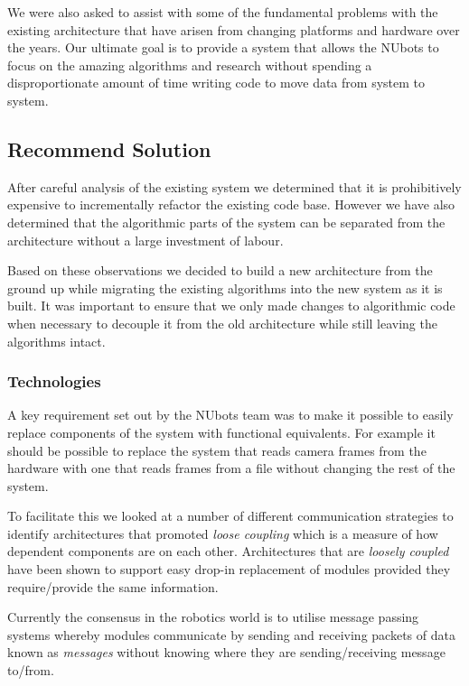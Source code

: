 \documentclass[english,12pt]{scrartcl}
\begin{document}
			We were also asked to assist with some of the fundamental problems with the existing architecture that have arisen from changing platforms and hardware over the years. 
			Our ultimate goal is to provide a system that allows the NUbots to focus on the amazing algorithms and research without spending a disproportionate amount of time writing code to move data from system to system.
				
		\subsection{Recommend Solution}
			After careful analysis of the existing system we determined that it is prohibitively expensive to incrementally refactor the existing code base.
			However we have also determined that the algorithmic parts of the system can be separated from the architecture without a large investment of labour. 
			
			Based on these observations we decided to build a new architecture from the ground up while migrating the existing algorithms into the new system as it is built.
			It was important to ensure that we only made changes to algorithmic code when necessary to decouple it from the old architecture while still leaving the algorithms intact.
			
			\subsubsection{Technologies}
				A key requirement set out by the NUbots team was to make it possible to easily replace components of the system with functional equivalents. 
				For example it should be possible to replace the system that reads camera frames from the hardware with one that reads frames from a file without changing the rest of the system.
				
				To facilitate this we looked at a number of different communication strategies to identify architectures that promoted \emph{loose coupling} which is a measure of how dependent components are on each other. 
				Architectures that are \emph{loosely coupled} have been shown to support easy drop-in replacement of modules provided they require/provide the same information.
				 
				Currently the consensus in the robotics world is to utilise message passing systems whereby modules communicate by sending and receiving packets of data known as \emph{messages} without knowing where they are sending/receiving message to/from.
				
\end{document}
